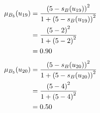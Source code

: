 \documentclass[a4paper,openany]{book}
\begin{document}
				\begin{align}
					\mu_{B_5}(u_{19}) &= \frac{\left(5-s_B(u_{19})\right)^2}{1 + \left(5-s_B(u_{19})\right)^2}\\
					&= \frac{\left(5-2\right)^2}{1 + \left(5-2\right)^2} \notag \\
					&= 0.90 \notag
				\end{align}
				\begin{align}
					\mu_{B_5}(u_{20}) &= \frac{\left(5-s_B(u_{20})\right)^2}{1 + \left(5-s_B(u_{20})\right)^2}\\
					&= \frac{\left(5-4\right)^2}{1 + \left(5-4\right)^2} \notag \\
					&= 0.50 \notag
				\end{align}
\end{document}
